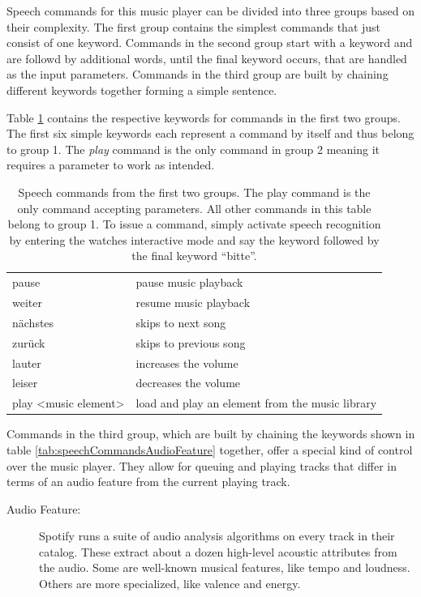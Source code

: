 Speech commands for this music player can be divided into three groups based on their complexity. The first group contains the simplest commands that just consist of one keyword. Commands in the second group start with a keyword and are followd by additional words, until the final keyword occurs, that are handled as the input parameters. Commands in the third group are built by chaining different keywords together forming a simple sentence.

Table \ref{tab:speechCommands} contains the respective keywords for commands in the first two groups. The first six simple keywords each represent a command by itself and thus belong to group 1. The \textit{play} command is the only command in group 2 meaning it requires a parameter to work as intended.
\newpage
\begin{table}[Hbt]
	\myfloatalign
	\begin{tabularx}{\textwidth}{XX} \toprule
		\tableheadline{Speech Command Keywords} & \tableheadline{Actions in Music Player} \\ 
		\midrule
		pause & pause music playback \\
		weiter & resume music playback \\
		n\"achstes & skips to next song \\
		zur\"uck & skips to previous song \\
		lauter & increases the volume \\
		leiser & decreases the volume \\
		\midrule
		play <music element> & load and play an element from the music library \\
		\bottomrule
	\end{tabularx}
	\caption{Speech commands from the first two groups. The play command is the only command accepting parameters. All other commands in this table belong to group 1. To issue a command, simply activate speech recognition by entering the watches interactive mode and say the keyword followed by the final keyword ``bitte''.}
	\label{tab:speechCommands}
\end{table}

Commands in the third group, which are built by chaining the keywords shown in table \ref{tab:speechCommandsAudioFeature} together, offer a special kind of control over the music player. They allow for queuing and playing tracks that differ in terms of an audio feature from the current playing track.
\begin{description}
	\item[Audio Feature:] Spotify runs a suite of audio analysis algorithms on every track in their catalog. These extract about a dozen high-level acoustic attributes from the audio. Some are well-known musical features, like tempo and loudness. Others are more specialized, like valence and energy.
\end{description}

